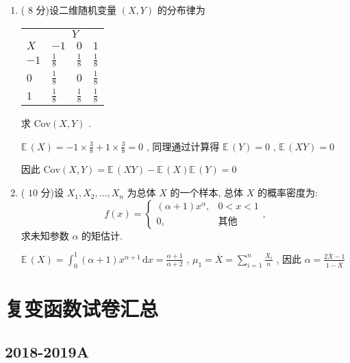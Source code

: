 \documentclass[cn,11pt,fancy,hide]{elegantbook}
\newcommand{\dd}{\,\mathrm{d}}
\newcommand{\EE}{\mathbb{E}\,}
\begin{document}
\begin{enumerate}
	\item ( $8$ 分)设二维随机变量 $(X,Y)$ 的分布律为
	\begin{center}
		\begin{tabularx}{0.8\textwidth}{ZZZZ}
			\hline
			& \\
			$X$ & $-1$ & $0$ & $1$\\
			\hline
			$-1$ & $\frac{1}{8}$ & $\frac{1}{8}$ & $\frac{1}{8}$\\
			$0$ & $\frac{1}{8}$ & $0$ & $\frac{1}{8}$\\
			$1$ & $\frac{1}{8}$ & $\frac{1}{8}$ & $\frac{1}{8}$\\
			\hline
		\end{tabularx}
	\end{center}
	求 $\mathrm{Cov}(X,Y)$ .
	\begin{solution}
		$\EE(X)=-1\times\frac{3}{8}+1\times\frac{3}{8}=0$ , 同理通过计算得 $\EE(Y)=0$ , $\EE(XY)=0$
		
		因此 $\text{Cov}(X,Y)=\EE(XY)-\EE(X)\EE(Y)=0$
	\end{solution}
	
	\item ( $10$ 分)设 $X_1,X_2,\ldots,X_n$ 为总体 $X$ 的一个样本, 总体 $X$ 的概率密度为:
	\begin{equation*}
	f(x)=
	\begin{cases}
	(\alpha+1)x^\alpha, & 0<x<1\\
	0, & \text{其他}
	\end{cases},
	\end{equation*}
	求未知参数 $\alpha$ 的矩估计.
	\begin{solution}
		$\EE(X)=\int_{0}^{1}(\alpha+1)x^{\alpha+1}\dd x=\frac{\alpha+1}{\alpha+2}$ , $\mu_1=\overline{X}=\sum_{i=1}^{n}\frac{X_i}{n}$ , 因此 $\alpha=\frac{2\overline{X}-1}{1-\overline{X}}$
	\end{solution}
\end{enumerate}






\chapter{复变函数试卷汇总}

\section{2018-2019A}
\end{document}
